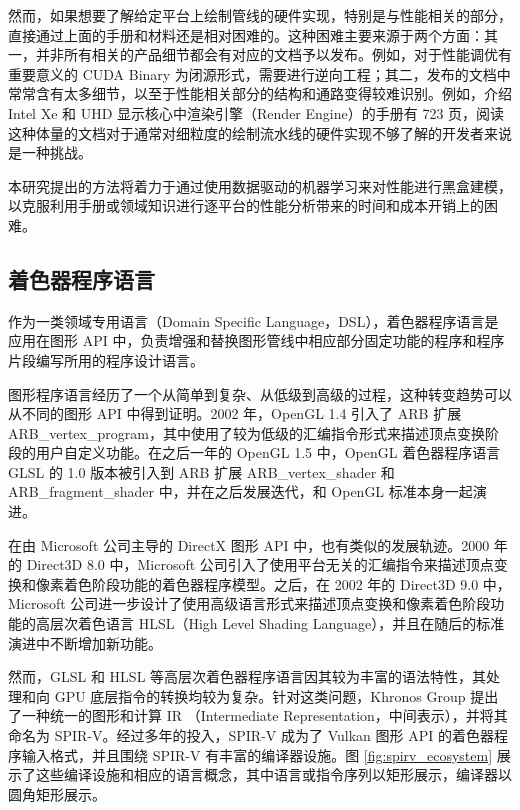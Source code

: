 然而，如果想要了解给定平台上绘制管线的硬件实现，特别是与性能相关的部分，直接通过上面的手册和材料还是相对困难的。这种困难主要来源于两个方面：其一，并非所有相关的产品细节都会有对应的文档予以发布。例如，对于性能调优有重要意义的 CUDA Binary 为闭源形式，需要进行逆向工程\cite{DecodingCUDABinary}；其二，发布的文档中常常含有太多细节，以至于性能相关部分的结构和通路变得较难识别。例如，介绍 Intel Xe 和 UHD 显示核心中渲染引擎（Render Engine）的手册有 723 页，阅读这种体量的文档对于通常对细粒度的绘制流水线的硬件实现不够了解的开发者来说是一种挑战。

本研究提出的方法将着力于通过使用数据驱动的机器学习来对性能进行黑盒建模，以克服利用手册或领域知识进行逐平台的性能分析带来的时间和成本开销上的困难。

\subsection{着色器程序语言}

作为一类领域专用语言（Domain Specific Language，DSL），着色器程序语言是应用在图形 API 中，负责增强和替换图形管线中相应部分固定功能的程序和程序片段编写所用的程序设计语言。


图形程序语言经历了一个从简单到复杂、从低级到高级的过程，这种转变趋势可以从不同的图形 API 中得到证明。2002 年，OpenGL 1.4 引入了 ARB 扩展 ARB\_vertex\_program，其中使用了较为低级的汇编指令形式来描述顶点变换阶段的用户自定义功能。在之后一年的 OpenGL 1.5 中，OpenGL 着色器程序语言 GLSL 的 1.0 版本被引入到 ARB 扩展 ARB\_vertex\_shader 和 ARB\_fragment\_shader 中，并在之后发展迭代，和 OpenGL 标准本身一起演进。

在由 Microsoft 公司主导的 DirectX 图形 API 中，也有类似的发展轨迹。2000 年的 Direct3D 8.0 中，Microsoft 公司引入了使用平台无关的汇编指令来描述顶点变换和像素着色阶段功能的着色器程序模型。之后，在 2002 年的 Direct3D 9.0 中，Microsoft 公司进一步设计了使用高级语言形式来描述顶点变换和像素着色阶段功能的高层次着色语言 HLSL（High Level Shading Language），并且在随后的标准演进中不断增加新功能。

然而，GLSL 和 HLSL 等高层次着色器程序语言因其较为丰富的语法特性，其处理和向 GPU 底层指令的转换均较为复杂。针对这类问题，Khronos Group 提出了一种统一的图形和计算 IR （Intermediate Representation，中间表示），并将其命名为 SPIR-V。经过多年的投入，SPIR-V 成为了 Vulkan 图形 API 的着色器程序输入格式，并且围绕 SPIR-V 有丰富的编译器设施。图 \ref{fig:spirv_ecosystem} 展示了这些编译设施和相应的语言概念，其中语言或指令序列以矩形展示，编译器以圆角矩形展示。


